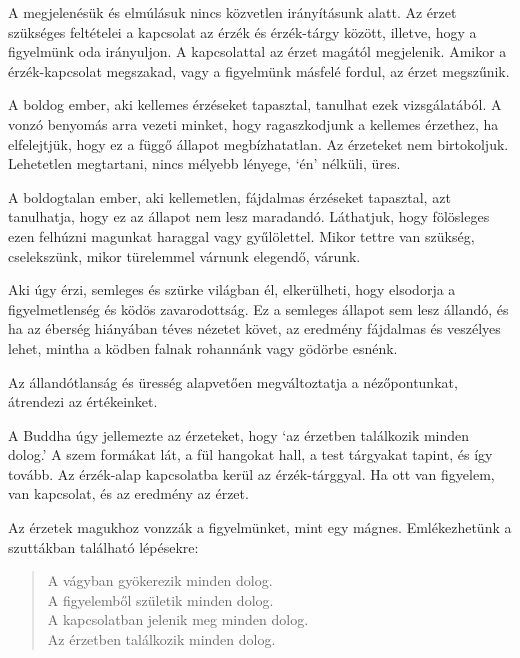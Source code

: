 A megjelenésük és elmúlásuk nincs közvetlen irányításunk alatt. Az érzet
szükséges feltételei a kapcsolat az érzék és érzék-tárgy között,
illetve, hogy a figyelmünk oda irányuljon. A kapcsolattal az érzet
magától megjelenik. Amikor a érzék-kapcsolat megszakad, vagy a
figyelmünk másfelé fordul, az érzet megszűnik.

A boldog ember, aki kellemes érzéseket tapasztal, tanulhat ezek
vizsgálatából. A vonzó benyomás arra vezeti minket, hogy ragaszkodjunk a
kellemes érzethez, ha elfelejtjük, hogy ez a függő állapot
megbízhatatlan. Az érzeteket nem birtokoljuk. Lehetetlen megtartani,
nincs mélyebb lényege, `én' nélküli, üres.

\enlargethispage*{\baselineskip}

A boldogtalan ember, aki kellemetlen, fájdalmas érzéseket tapasztal, azt
tanulhatja, hogy ez az állapot nem lesz maradandó. Láthatjuk, hogy
fölösleges ezen felhúzni magunkat haraggal vagy gyűlölettel. Mikor
tettre van szükség, cselekszünk, mikor türelemmel várnunk elegendő,
várunk.

Aki úgy érzi, semleges és szürke világban él, elkerülheti, hogy
elsodorja a figyelmetlenség és ködös zavarodottság. Ez a semleges
állapot sem lesz állandó, és ha az éberség hiányában téves nézetet
követ, az eredmény fájdalmas és veszélyes lehet, mintha a ködben falnak
rohannánk vagy gödörbe esnénk.

Az állandótlanság és üresség alapvetően megváltoztatja a nézőpontunkat,
átrendezi az értékeinket.

A Buddha úgy jellemezte az érzeteket, hogy `az érzetben találkozik
minden dolog.' A szem formákat lát, a fül hangokat hall, a test
tárgyakat tapint, és így tovább. Az érzék-alap kapcsolatba kerül az
érzék-tárggyal. Ha ott van figyelem, van kapcsolat, és az eredmény az
érzet.

Az érzetek magukhoz vonzzák a figyelmünket, mint egy mágnes.
Emlékezhetünk a szuttákban található lépésekre:

\begin{quote}
A vágyban gyökerezik minden dolog.\\
A figyelemből születik minden dolog.\\
A kapcsolatban jelenik meg minden dolog.\\
Az érzetben találkozik minden dolog.

\bigskip

\end{quote}

